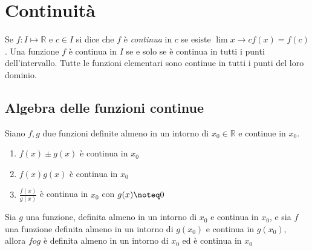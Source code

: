 \documentclass[a4class]{report}
\newcommand{\numberset}{\mathbb}
\newcommand{\R}{\numberset{R}}
\begin{document}
\section{Continuità}
Se $f:I \mapsto \R$ e $c \in I$ si dice che $f$ è \textit{continua} in $c$ se esiste $\lim{x \to c}{f(x)} = f(c)$.
Una funzione $f$ è continua in $I$ se e solo se è continua in tutti i punti dell'intervallo.
Tutte le funzioni elementari sono continue in tutti i punti del loro dominio.


\subsection{Algebra delle funzioni continue}
Siano $f,g$ due funzioni definite almeno in un intorno di $x_0 \in \R$ e continue in $x_0$.
\begin{enumerate}
  \item $f(x) \pm g(x)$ è continua in $x_0$
  \item $f(x)g(x)$ è continua in $x_0$
  \item $\frac{f(x)}{g(x)}$ è continua in $x_0$ con $g(x) \noteq 0$
\end{enumerate}


Sia $g$ una funzione, definita almeno in un intorno di $x_0$ e continua in $x_0$, e sia
$f$ una funzione definita almeno in un intorno di $g(x_0)$ e continua in $g(x_0)$, allora
$f o g$ è definita almeno in un intorno di $x_0$ ed è continua in $x_0$

\end{document}
